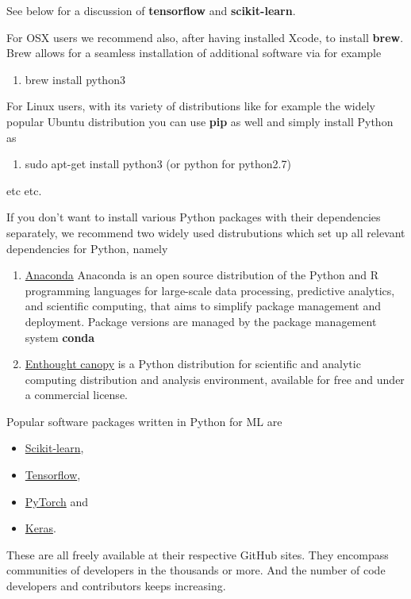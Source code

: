 \documentclass[%
oneside,                 %
final,                   %
10pt]{article}
\begin{document}
See below for a discussion of \textbf{tensorflow} and \textbf{scikit-learn}. 

For OSX users we recommend also, after having installed Xcode, to install \textbf{brew}. Brew allows 
for a seamless installation of additional software via for example
\begin{enumerate}
\item brew install python3
\end{enumerate}

\noindent
For Linux users, with its variety of distributions like for example the widely popular Ubuntu distribution
you can use \textbf{pip} as well and simply install Python as 
\begin{enumerate}
\item sudo apt-get install python3  (or python for python2.7)
\end{enumerate}

\noindent
etc etc. 

If you don't want to install various Python packages with their dependencies separately, we recommend two widely used distrubutions which set up  all relevant dependencies for Python, namely
\begin{enumerate}
\item \href{{https://docs.anaconda.com/}}{Anaconda} Anaconda is an open source distribution of the Python and R programming languages for large-scale data processing, predictive analytics, and scientific computing, that aims to simplify package management and deployment. Package versions are managed by the package management system \textbf{conda}

\item \href{{https://www.enthought.com/product/canopy/}}{Enthought canopy}  is a Python distribution for scientific and analytic computing distribution and analysis environment, available for free and under a commercial license.
\end{enumerate}

\noindent
Popular software packages written in Python for ML are

\begin{itemize}
\item \href{{http://scikit-learn.org/stable/}}{Scikit-learn}, 

\item \href{{https://www.tensorflow.org/}}{Tensorflow},

\item \href{{http://pytorch.org/}}{PyTorch} and 

\item \href{{https://keras.io/}}{Keras}.
\end{itemize}

\noindent
These are all freely available at their respective GitHub sites. They 
encompass communities of developers in the thousands or more. And the number
of code developers and contributors keeps increasing.


\end{document}
